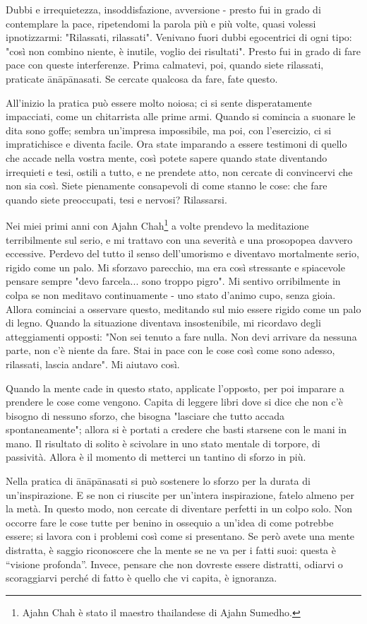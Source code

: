 Dubbi e irrequietezza, insoddisfazione, avversione - presto fui in grado
di contemplare la pace, ripetendomi la parola più e più volte, quasi
volessi ipnotizzarmi: "Rilassati, rilassati". Venivano fuori dubbi
egocentrici di ogni tipo: "così non combino niente, è inutile, voglio
dei risultati". Presto fui in grado di fare pace con queste
interferenze. Prima calmatevi, poi, quando siete rilassati, praticate
ānāpānasati. Se cercate qualcosa da fare, fate questo.

All'inizio la pratica può essere molto noiosa; ci si sente
disperatamente impacciati, come un chitarrista alle prime armi. Quando
si comincia a suonare le dita sono goffe; sembra un'impresa impossibile,
ma poi, con l'esercizio, ci si impratichisce e diventa facile. Ora state
imparando a essere testimoni di quello che accade nella vostra mente,
così potete sapere quando state diventando irrequieti e tesi, ostili a
tutto, e ne prendete atto, non cercate di convincervi che non sia così.
Siete pienamente consapevoli di come stanno le cose: che fare quando
siete preoccupati, tesi e nervosi? Rilassarsi.

Nei miei primi anni con Ajahn Chah\footnote{Ajahn Chah è stato il maestro thailandese di Ajahn
Sumedho.} a volte prendevo la
meditazione terribilmente sul serio, e mi trattavo con una severità e
una prosopopea davvero eccessive. Perdevo del tutto il senso
dell'umorismo e diventavo mortalmente serio, rigido come un palo. Mi
sforzavo parecchio, ma era così stressante e spiacevole pensare sempre
"devo farcela... sono troppo pigro". Mi sentivo orribilmente in colpa se
non meditavo continuamente - uno stato d'animo cupo, senza gioia. Allora
cominciai a osservare questo, meditando sul mio essere rigido come un
palo di legno. Quando la situazione diventava insostenibile, mi
ricordavo degli atteggiamenti opposti: "Non sei tenuto a fare nulla. Non
devi arrivare da nessuna parte, non c'è niente da fare. Stai in pace con
le cose così come sono adesso, rilassati, lascia andare". Mi aiutavo
così.

Quando la mente cade in questo stato, applicate l'opposto, per poi
imparare a prendere le cose come vengono. Capita di leggere libri dove
si dice che non c'è bisogno di nessuno sforzo, che bisogna "lasciare che
tutto accada spontaneamente"; allora si è portati a credere che basti
starsene con le mani in mano. Il risultato di solito è scivolare in uno
stato mentale di torpore, di passività. Allora è il momento di metterci
un tantino di sforzo in più.

Nella pratica di ānāpānasati si può sostenere lo sforzo per la durata di
un'inspirazione. E se non ci riuscite per un'intera inspirazione, fatelo
almeno per la metà. In questo modo, non cercate di diventare perfetti in
un colpo solo. Non occorre fare le cose tutte per benino in ossequio a
un'idea di come potrebbe essere; si lavora con i problemi così come si
presentano. Se però avete una mente distratta, è saggio riconoscere che
la mente se ne va per i fatti suoi: questa è “visione profonda”. Invece,
pensare che non dovreste essere distratti, odiarvi o scoraggiarvi perché
di fatto è quello che vi capita, è ignoranza.

